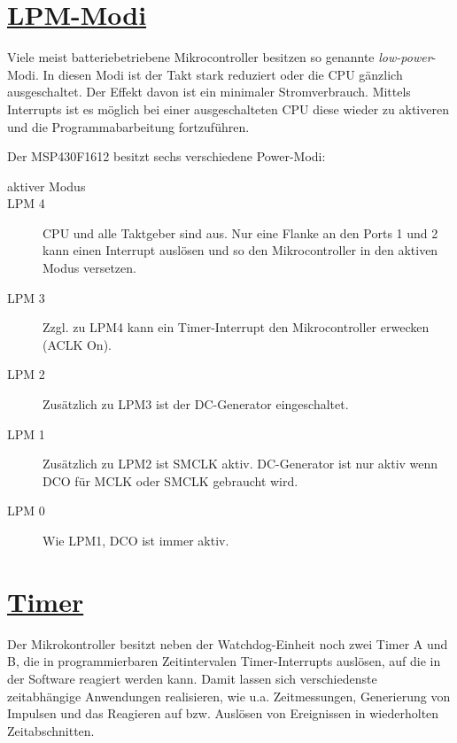 \documentclass[11pt,german]{scrartcl}
\begin{document}
\clearpage
\section*
{\href{http://cst.mi.fu-berlin.de/intern/19606-P-MPP/Aufgaben/040500.html}
{LPM-Modi}}

Viele meist batteriebetriebene Mikrocontroller besitzen so genannte \emph{low-power}-Modi.
In diesen Modi ist der Takt stark reduziert oder die CPU gänzlich ausgeschaltet. Der Effekt davon ist ein minimaler Stromverbrauch.
Mittels Interrupts ist es möglich bei einer ausgeschalteten CPU diese wieder zu aktiveren und die Programmabarbeitung fortzuführen.

Der MSP430F1612 besitzt sechs verschiedene Power-Modi:
\begin{description}
    \item [aktiver Modus]
    \item [LPM 4]  CPU und alle Taktgeber sind aus. Nur eine Flanke an den Ports 1 und 2 kann einen Interrupt auslösen und so den Mikrocontroller in den aktiven Modus versetzen.
    \item [LPM 3] Zzgl. zu LPM4 kann ein Timer-Interrupt den Mikrocontroller erwecken (ACLK On).
    \item [LPM 2] Zusätzlich zu LPM3 ist der DC-Generator eingeschaltet.
    \item [LPM 1] Zusätzlich zu LPM2 ist SMCLK aktiv. DC-Generator ist nur aktiv wenn DCO für MCLK oder SMCLK gebraucht wird.
    \item [LPM 0] Wie LPM1, DCO ist immer aktiv.
\end{description}






\clearpage
\section*
{\href{http://cst.mi.fu-berlin.de/intern/19606-P-MPP/Aufgaben/040600.html}
{Timer}}

Der Mikrokontroller besitzt neben der Watchdog-Einheit noch zwei Timer A und B, die in programmierbaren Zeitintervalen Timer-Interrupts auslösen, auf die in der Software reagiert werden kann. Damit lassen sich verschiedenste zeitabhängige Anwendungen realisieren, wie u.a. Zeitmessungen, Generierung von Impulsen und das Reagieren auf bzw. Auslösen von Ereignissen in wiederholten Zeitabschnitten.
\end{document}
